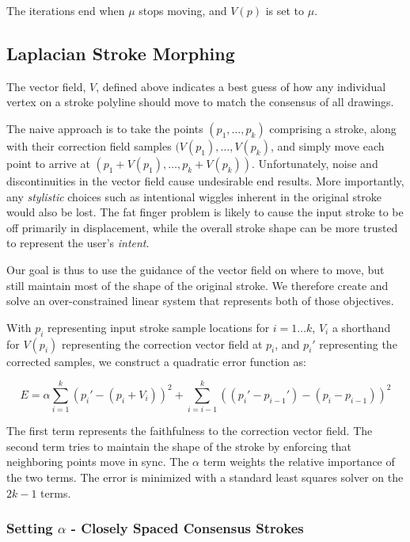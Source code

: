 The iterations end when $\mu$ stops moving, and $V(p)$ is set to $\mu$.

\subsection{Laplacian Stroke Morphing}


The vector field, $V$, defined above indicates a best guess of how any individual vertex on a stroke polyline should move to match the consensus of all drawings.

The naive approach is to take the points $(p_1, \ldots, p_k)$ comprising a stroke, along with their correction field samples $(V(p_1), \ldots, V(p_k)$, and simply move each point to arrive at $(p_1 + V(p_1), \ldots, p_k + V(p_k))$.  Unfortunately, noise and discontinuities in the vector field cause undesirable end results. More importantly, any {\em stylistic} choices such as intentional wiggles inherent in the original stroke would also be lost. The fat finger problem is likely to cause the input stroke to be off primarily in displacement, while the overall stroke shape can be more trusted to represent the user's {\em intent}.

Our goal is thus to use the guidance of the vector field on where to move, but still maintain most of the shape of the original stroke.  We therefore create and solve an over-constrained linear system that represents both of those objectives.  

With $p_i$ representing input stroke sample locations for $i=1\ldots k$, $V_i$ a shorthand for $V(p_i)$ representing the correction vector field at $p_i$, and $p_i'$ representing the corrected samples, we construct a quadratic error function as:

\begin{equation}
E = \alpha \sum_{i=1}^k (p_i' - (p_i + V_i))^2 +  \sum_{i=i-1}^k ((p_i' - p_{i-1}') - (p_i - p_{i-1}))^2
\end{equation}

The first term represents the faithfulness to the correction vector field. The second term tries to maintain the shape of the stroke by enforcing that neighboring points move in sync. The $\alpha$ term weights the relative importance of the two terms. The error is minimized with a standard least squares solver on the $2k-1$ terms.

\subsubsection{Setting $\alpha$ - Closely Spaced Consensus Strokes}

